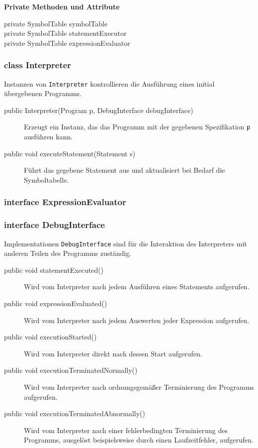 \textbf{Private Methoden und Attribute}
\begin{description}
    \item[private SymbolTable symbolTable]
    \item[private SymbolTable statementExecutor]
    \item[private SymbolTable expressionEvaluator]
\end{description}


\subsubsection{class Interpreter}

Instanzen von \texttt{Interpreter} kontrollieren die Ausführung eines initial übergebenen Programms.

\begin{description}
    \item[public Interpreter(Program p, DebugInterface debugInterface)]
    Erzeugt ein Instanz, das das Programm mit der gegebenen Spezifikation \texttt{p} ausführen kann.

    \item[public void executeStatement(Statement s)]
    Führt das gegebene Statement aus und aktualisiert bei Bedarf die Symboltabelle.
\end{description}


\subsubsection{interface ExpressionEvaluator}
\subsubsection{interface DebugInterface}
Implementationen \texttt{DebugInterface} sind für die Interaktion des Interpreters mit anderen Teilen des Programms zuständig.

\begin{description}
    \item[public void statementExecuted()]
    Wird vom Interpreter nach jedem Ausführen eines Statements aufgerufen.
    \item[public void expressionEvaluated()]
    Wird vom Interpreter nach jedem Auswerten jeder Expression aufgerufen.
    \item[public void executionStarted()]
    Wird vom Interpreter direkt nach dessen Start aufgerufen.
    \item[public void executionTerminatedNormally()]
    Wird vom Interpreter nach ordnungsgemäßer Terminierung des Programms aufgerufen.
    \item[public void executionTerminatedAbnormally()]
    Wird vom Interpreter nach einer fehlerbedingten Terminierung des Programms, ausgelöst beispielsweise durch einen Laufzeitfehler, aufgerufen.
\end{description}
